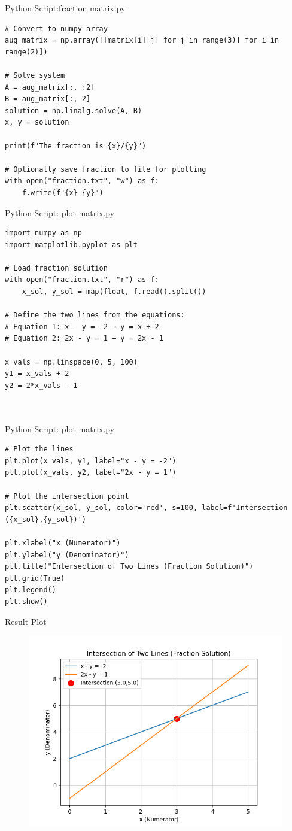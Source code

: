 \documentclass{beamer}
\numberwithin{equation}{section}
\theoremstyle{remark}
\begin{document}
\begin{frame}[fragile]{Python Script:fraction matrix.py}
\begin{verbatim}
# Convert to numpy array
aug_matrix = np.array([[matrix[i][j] for j in range(3)] for i in range(2)])

# Solve system
A = aug_matrix[:, :2]
B = aug_matrix[:, 2]
solution = np.linalg.solve(A, B)
x, y = solution

print(f"The fraction is {x}/{y}")

# Optionally save fraction to file for plotting
with open("fraction.txt", "w") as f:
    f.write(f"{x} {y}")

\end{verbatim}
\end{frame}

\begin{frame}[fragile]{Python Script: plot matrix.py}
\begin{verbatim}
import numpy as np
import matplotlib.pyplot as plt

# Load fraction solution
with open("fraction.txt", "r") as f:
    x_sol, y_sol = map(float, f.read().split())

# Define the two lines from the equations:
# Equation 1: x - y = -2 → y = x + 2
# Equation 2: 2x - y = 1 → y = 2x - 1

x_vals = np.linspace(0, 5, 100)
y1 = x_vals + 2
y2 = 2*x_vals - 1



\end{verbatim}
\end{frame}
\begin{frame}[fragile]{Python Script: plot matrix.py}
\begin{verbatim}
# Plot the lines
plt.plot(x_vals, y1, label="x - y = -2")
plt.plot(x_vals, y2, label="2x - y = 1")

# Plot the intersection point
plt.scatter(x_sol, y_sol, color='red', s=100, label=f'Intersection ({x_sol},{y_sol})')

plt.xlabel("x (Numerator)")
plt.ylabel("y (Denominator)")
plt.title("Intersection of Two Lines (Fraction Solution)")
plt.grid(True)
plt.legend()
plt.show()
\end{verbatim}
\end{frame}

\begin{frame}{Result Plot}
 \begin{figure}[H]
     \centering
     \includegraphics[width=0.7\columnwidth]{figs/fig1.png}
     \caption*{}
     \label{fig:fig1}
 \end{figure}
 
\end{frame}
\end{document}
